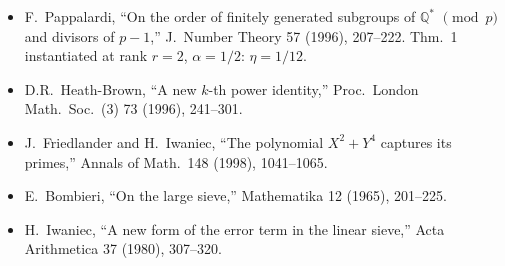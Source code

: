 \documentclass[12pt]{amsart}
\theoremstyle{definition}
\theoremstyle{remark}
\begin{document}
\begin{itemize}
\item[{[P96]}] F.~Pappalardi, ``On the order of finitely generated subgroups of $\mathbb{Q}^*$ $\pmod p$ and divisors of $p - 1$,'' J.~Number Theory 57 (1996), 207--222. Thm.~1 instantiated at rank $r = 2$, $\alpha = 1/2$: $\eta = 1/12$.
\item[{[HB96]}] D.R.~Heath-Brown, ``A new $k$-th power identity,'' Proc.~London Math.~Soc.~(3) 73 (1996), 241--301.
\item[{[FI98]}] J.~Friedlander and H.~Iwaniec, ``The polynomial $X^2 + Y^4$ captures its primes,'' Annals of Math.~148 (1998), 1041--1065.
\item[{[BV65]}] E.~Bombieri, ``On the large sieve,'' Mathematika 12 (1965), 201--225.
\item[{[L80]}] H.~Iwaniec, ``A new form of the error term in the linear sieve,'' Acta Arithmetica 37 (1980), 307--320.
\end{itemize}
\end{document}
